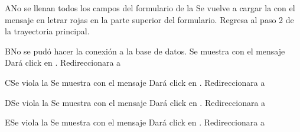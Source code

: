 		\begin{UCtrayectoriaA}{A}{No se llenan todos los campos del formulario de la   }
			\UCpaso[\UCsist] Se vuelve a cargar la   con el mensaje  en letrar rojas en la parte superior del formulario.
			\UCpaso[\UCsist] Regresa al paso 2 de la trayectoria principal.
		\end{UCtrayectoriaA}


		\begin{UCtrayectoriaA}{B}{No se pudó hacer la conexión a la base de datos.  }
			\UCpaso[\UCsist] Se muestra    con el mensaje 
			\UCpaso[\UCactor] Dará click en  .
			\UCpaso[\UCsist] Redireccionara a    
		\end{UCtrayectoriaA}

		\begin{UCtrayectoriaA}{C}{Se viola la   }
			\UCpaso[\UCsist] Se muestra     con el mensaje 
			\UCpaso[\UCactor] Dará click en  .
			\UCpaso[\UCsist] Redireccionara a    
		\end{UCtrayectoriaA}

		\begin{UCtrayectoriaA}{D}{Se viola la   }
			\UCpaso[\UCsist] Se muestra    con el mensaje 
			\UCpaso[\UCactor] Dará click en  .
			\UCpaso[\UCsist] Redireccionara a    
		\end{UCtrayectoriaA}

		\begin{UCtrayectoriaA}{E}{Se viola la   }
			\UCpaso[\UCsist] Se muestra    con el mensaje 
			\UCpaso[\UCactor] Dará click en  .
			\UCpaso[\UCsist] Redireccionara a    
		\end{UCtrayectoriaA}

